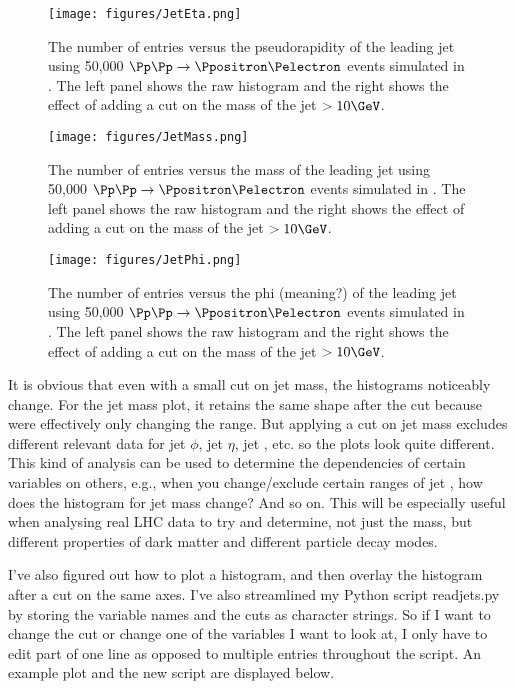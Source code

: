 \begin{figure}[htbp]
\centering
\texttt{[image: figures/JetEta.png]}
\caption{The number of entries versus the pseudorapidity of the leading jet using 50,000 $\Pp\Pp \rightarrow \Ppositron \Pelectron$ events simulated in \madgraph. The left panel shows the raw histogram and the right shows the effect of adding a cut on the mass of the jet $>10\GeV$.}
\end{figure}

\begin{figure}[htbp]
\centering
\texttt{[image: figures/JetMass.png]}
\caption{The number of entries versus the mass of the leading jet using 50,000 $\Pp\Pp \rightarrow \Ppositron \Pelectron$ events simulated in \madgraph. The left panel shows the raw histogram and the right shows the effect of adding a cut on the mass of the jet $>10\GeV$.}
\end{figure}

\begin{figure}[htbp]
\centering
\texttt{[image: figures/JetPhi.png]}
\caption{The number of entries versus the phi (meaning?) of the leading jet using 50,000 $\Pp\Pp \rightarrow \Ppositron \Pelectron$ events simulated in \madgraph. The left panel shows the raw histogram and the right shows the effect of adding a cut on the mass of the jet $>10\GeV$.}
\end{figure}

It is obvious that even with a small cut on jet mass, the histograms noticeably change. For the jet mass plot, it retains the same shape after the cut because were effectively only changing the range. But applying a cut on jet mass excludes different relevant data for jet $\phi$, jet $\eta$, jet \pt, etc. so the plots look quite different. This kind of analysis can be used to determine the dependencies of certain variables on others, e.g., when you change/exclude certain ranges of jet \pt, how does the histogram for jet mass change? And so on. This will be especially useful when analysing real LHC data to try and determine, not just the mass, but different properties of dark matter and different particle decay modes.

I've also figured out how to plot a histogram, and then overlay the histogram after a cut on the same axes. I've also streamlined my Python script readjets.py by storing the variable names and the cuts as character strings. So if I want to change the cut or change one of the variables I want to look at, I only have to edit part of one line as opposed to multiple entries throughout the script. An example plot and the new script are displayed below.

